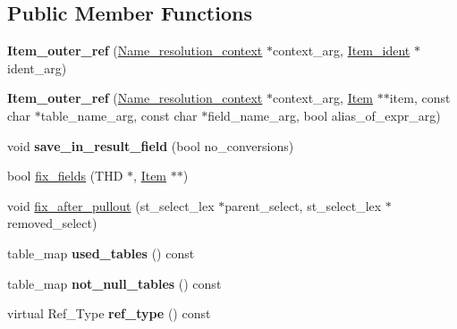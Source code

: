 \subsection*{Public Member Functions}
\begin{DoxyCompactItemize}
\item 
\mbox{\label{classItem__outer__ref_a00c058e47094ba628524023960d0638f}} 
{\bfseries Item\+\_\+outer\+\_\+ref} (\mbox{\hyperlink{structName__resolution__context}{Name\+\_\+resolution\+\_\+context}} $\ast$context\+\_\+arg, \mbox{\hyperlink{classItem__ident}{Item\+\_\+ident}} $\ast$ident\+\_\+arg)
\item 
\mbox{\label{classItem__outer__ref_aae2c4e7bd3b12889c0448b2bce1d9f8d}} 
{\bfseries Item\+\_\+outer\+\_\+ref} (\mbox{\hyperlink{structName__resolution__context}{Name\+\_\+resolution\+\_\+context}} $\ast$context\+\_\+arg, \mbox{\hyperlink{classItem}{Item}} $\ast$$\ast$item, const char $\ast$table\+\_\+name\+\_\+arg, const char $\ast$field\+\_\+name\+\_\+arg, bool alias\+\_\+of\+\_\+expr\+\_\+arg)
\item 
\mbox{\label{classItem__outer__ref_ae9af1455f1442b4e5d6ef2543e72d26c}} 
void {\bfseries save\+\_\+in\+\_\+result\+\_\+field} (bool no\+\_\+conversions)
\item 
bool \mbox{\hyperlink{classItem__outer__ref_afa87a075b4924dc80749a8e02605d196}{fix\+\_\+fields}} (T\+HD $\ast$, \mbox{\hyperlink{classItem}{Item}} $\ast$$\ast$)
\item 
void \mbox{\hyperlink{classItem__outer__ref_a30ff5c4083f8d4d7c6ab5c7b2b4fac0c}{fix\+\_\+after\+\_\+pullout}} (st\+\_\+select\+\_\+lex $\ast$parent\+\_\+select, st\+\_\+select\+\_\+lex $\ast$removed\+\_\+select)
\item 
\mbox{\label{classItem__outer__ref_aa2c513fa1efe5ea75783011cc55fa6f1}} 
table\+\_\+map {\bfseries used\+\_\+tables} () const
\item 
\mbox{\label{classItem__outer__ref_aa5e01a31254b73761d63af519e820c0e}} 
table\+\_\+map {\bfseries not\+\_\+null\+\_\+tables} () const
\item 
\mbox{\label{classItem__outer__ref_a8f395d509b8eafcd8a026dbc8c50512d}} 
virtual Ref\+\_\+\+Type {\bfseries ref\+\_\+type} () const
\end{DoxyCompactItemize}

